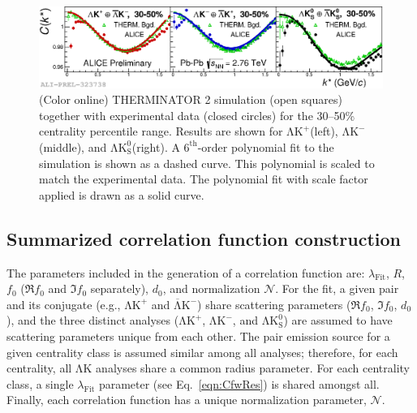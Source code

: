 \documentclass{svproc}
\newcommand{\LamK}{$\mathrm{\Lambda}\mathrm{K}$\xspace}
\newcommand{\LamKchP}{$\mathrm{\Lambda}\mathrm{K^{+}}$\xspace}
\newcommand{\ALamKchM}{$\overline{\mathrm{\Lambda}}\mathrm{K^{-}}$\xspace}
\newcommand{\LamKchM}{$\mathrm{\Lambda}\mathrm{K^{-}}$\xspace}
\newcommand{\LamKs}{$\mathrm{\Lambda}\mathrm{K^{0}_{S}}$\xspace}
\begin{document}
\begin{figure}[h]
  \centering
  \includegraphics[width=\textwidth]{./Figures/Approved/OtherFormats/EPS/2019-06-11-BgdwFitOnly_RandomEPs_NumWeight1_Full_AllAnwConj_3050.eps}
  \caption[Backgrounds with THERMINATOR 2]
  {
  (Color online) THERMINATOR 2 simulation (open squares) together with experimental data (closed circles) for the 30--50\% centrality percentile range.  
  Results are shown for \LamKchP (left), \LamKchM (middle), and \LamKs (right).
  A $6^{\mathrm{th}}$-order polynomial fit to the simulation is shown as a dashed curve.  
  This polynomial is scaled to match the experimental data.  
  The polynomial fit with scale factor applied is drawn as a solid curve.
  }
  \label{fig:BgdswTHERM}
\end{figure} 


\subsection{Summarized correlation function construction}
\label{SummarizedFitProcedure}

The parameters included in the generation of a correlation function are: $\lambda_{\mathrm{Fit}}$, $R$, $f_{0}$ ($\Re f_{0}$ and $\Im f_{0}$ separately), $d_{0}$, and normalization $\mathcal{N}$.
For the fit, a given pair and its conjugate (e.g., \LamKchP and \ALamKchM) share scattering parameters ($\Re f_{0}$, $\Im f_{0}$, $d_{0}$), and the three distinct analyses (\LamKchP, \LamKchM, and \LamKs) are assumed to have scattering parameters unique from each other.
The pair emission source for a given centrality class is assumed similar among all analyses; therefore, for each centrality, all \LamK analyses share a common radius parameter.
For each centrality class, a single $\lambda_{\mathrm{Fit}}$ parameter (see Eq.~\ref{eqn:CfwRes}) is shared amongst all.
Finally, each correlation function has a unique normalization parameter, $\mathcal{N}$.
\end{document}
